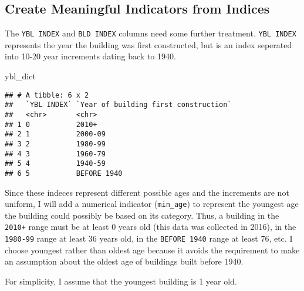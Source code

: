 \documentclass[]{article}
\newenvironment{Shaded}{\begin{snugshade}}{\end{snugshade}}
\newcommand{\NormalTok}[1]{#1}
\begin{document}
\hypertarget{create-meaningful-indicators-from-indices}{%
\subsection{Create Meaningful Indicators from
Indices}\label{create-meaningful-indicators-from-indices}}

The \texttt{YBL\ INDEX} and \texttt{BLD\ INDEX} columns need some
further treatment. \texttt{YBL\ INDEX} represents the year the building
was first constructed, but is an index seperated into 10-20 year
increments dating back to 1940.

\begin{Shaded}
\begin{Highlighting}[]
\NormalTok{ybl_dict}
\end{Highlighting}
\end{Shaded}

\begin{verbatim}
## # A tibble: 6 x 2
##   `YBL INDEX` `Year of building first construction`
##   <chr>       <chr>                                
## 1 0           2010+                                
## 2 1           2000-09                              
## 3 2           1980-99                              
## 4 3           1960-79                              
## 5 4           1940-59                              
## 6 5           BEFORE 1940
\end{verbatim}

Since these indeces represent different possible ages and the increments
are not uniform, I will add a numerical indicator (\texttt{min\_age}) to
represent the youngest age the building could possibly be based on its
category. Thus, a building in the \texttt{2010+} range must be at least
0 years old (this data was collected in 2016), in the \texttt{1980-99}
range at least 36 years old, in the \texttt{BEFORE\ 1940} range at least
76, etc. I choose youngest rather than oldest age because it avoids the
requirement to make an assumption about the oldest age of buildings
built before 1940.

For simplicity, I assume that the youngest building is 1 year old.
\end{document}
